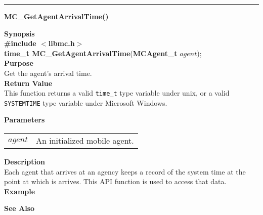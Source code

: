 \noindent
\vspace{5pt}
\rule{6.5in}{0.015in}
\noindent
{}
{\LARGE \bf MC\_GetAgentArrivalTime()}\\
\label{api:MC_GetAgentArrivalTime()}

\noindent
{\bf Synopsis}\\
{\bf \#include $<$libmc.h$>$}\\
{\bf time\_t MC\_GetAgentArrivalTime}({\bf MCAgent\_t} $agent$);\\

\noindent
{\bf Purpose}\\
Get the agent's arrival time.\\

\noindent
{\bf Return Value}\\
This function returns a valid \texttt{time\_t} type variable under unix,
or a valid \texttt{SYSTEMTIME} type variable under Microsoft Windows.

\noindent
{\bf Parameters}
\vspace{-0.1in}
\begin{description}
\item
\begin{tabular}{p{10 mm}p{145 mm}} 
$agent$ & An initialized mobile agent.
\end{tabular}
\end{description}

\noindent
{\bf Description}\\
Each agent that arrives at an agency keeps a record of the system time
at the point at which is arrives. This API function is used to access
that data. \\

\noindent
{\bf Example}\\
\noindent

\noindent
{\bf See Also}\\

